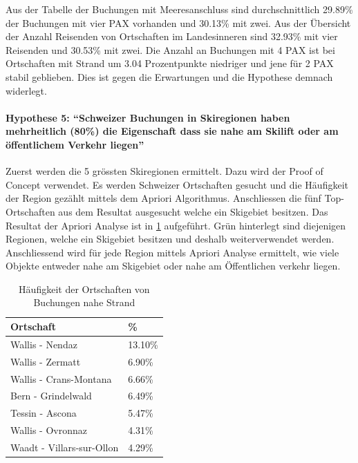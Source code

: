 Aus der Tabelle der Buchungen mit Meeresanschluss sind durchschnittlich \colorbox{green!25}{29.89\%} der Buchungen mit vier PAX vorhanden und \colorbox{red!25}{30.13\%} mit zwei. Aus der Übersicht der Anzahl Reisenden von Ortschaften im Landesinneren sind \colorbox{green!25}{32.93\%} mit vier Reisenden und \colorbox{red!25}{30.53\%} mit zwei. Die Anzahl an Buchungen mit 4 PAX ist bei Ortschaften mit Strand um 3.04 Prozentpunkte niedriger und jene für 2 PAX stabil geblieben. Dies ist gegen die Erwartungen und die Hypothese demnach widerlegt.

\paragraph{Hypothese 5: "`Schweizer Buchungen in Skiregionen haben mehrheitlich (80\%) die Eigenschaft dass sie nahe am Skilift oder am öffentlichem Verkehr liegen"'} Zuerst werden die 5 grössten Skiregionen ermittelt. Dazu wird der Proof of Concept verwendet. Es werden Schweizer Ortschaften gesucht und die Häufigkeit der Region gezählt mittels dem Apriori Algorithmus. Anschliessen die fünf Top-Ortschaften aus dem Resultat ausgesucht welche ein Skigebiet besitzen. Das Resultat der Apriori Analyse ist in \cref{sec:testingfazit:testing:hypothesen:4} aufgeführt. \colorbox{green!25}{Grün} hinterlegt sind diejenigen Regionen, welche ein Skigebiet besitzen und deshalb weiterverwendet werden. Anschliessend wird für jede Region mittels Apriori Analyse ermittelt, wie viele Objekte entweder nahe am Skigebiet oder nahe am Öffentlichen verkehr liegen. 

\begin{table}[H] 
	\caption{Häufigkeit der Ortschaften von Buchungen nahe Strand}
	\centering
	\label{sec:testingfazit:testing:hypothesen:4}
	\begin{tabular}{ | l | l | } 
		\hline 
		\rowcolor{tableheadcolor}
		\bfseries Ortschaft & \bfseries \% \\ \hline 
		\cellcolor{green!25}Wallis - Nendaz & \cellcolor{green!25}13.10\% \\ \hline 
		\cellcolor{green!25}Wallis - Zermatt & \cellcolor{green!25}6.90\% \\ \hline 
		\cellcolor{green!25}Wallis - Crans-Montana & \cellcolor{green!25}6.66\% \\ \hline 
		\cellcolor{green!25}Bern - Grindelwald & \cellcolor{green!25}6.49\% \\ \hline 
		Tessin - Ascona & 5.47\% \\ \hline 
		Wallis - Ovronnaz & 4.31\% \\ \hline 
		\cellcolor{green!25}Waadt - Villars-sur-Ollon & \cellcolor{green!25}4.29\% \\ \hline
	\end{tabular}
\end{table}

